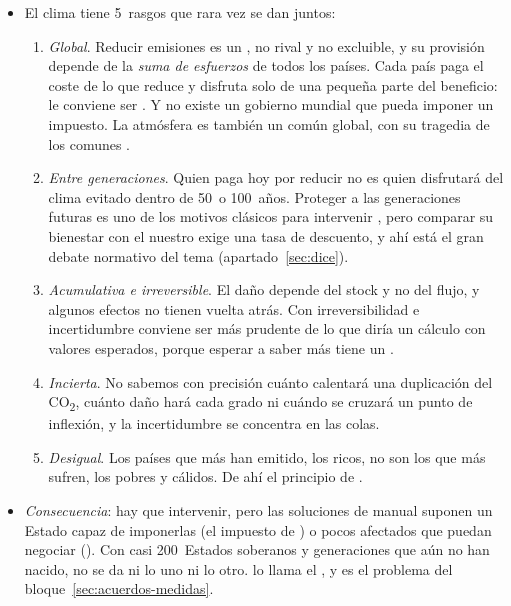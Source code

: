 \documentclass[11pt]{article}
\begin{document}
\begin{itemize}
\item El clima tiene 5~rasgos que rara vez se dan juntos:
  \begin{enumerate}
  \item \emph{Global}. Reducir emisiones es un , no rival y no excluible, y su provisión depende de la \emph{suma de esfuerzos} de todos los países\nocite{Hirshleifer1983Weakest}. Cada país paga el coste de lo que reduce y disfruta solo de una pequeña parte del beneficio: le conviene ser . Y no existe un gobierno mundial que pueda imponer un impuesto\nocite{Kindleberger1986International}. La atmósfera es también un común global, con su tragedia de los comunes .
  \item \emph{Entre generaciones}. Quien paga hoy por reducir no es quien disfrutará del clima evitado dentro de 50~o 100~años. Proteger a las generaciones futuras es uno de los motivos clásicos para intervenir , pero comparar su bienestar con el nuestro exige una tasa de descuento, y ahí está el gran debate normativo del tema (apartado~\ref{sec:dice}).
  \item \emph{Acumulativa e irreversible}. El daño depende del stock y no del flujo, y algunos efectos no tienen vuelta atrás. Con irreversibilidad e incertidumbre conviene ser más prudente de lo que diría un cálculo con valores esperados, porque esperar a saber más tiene un \nocite{ArrowFisher1974Environmental}.
  \item \emph{Incierta}. No sabemos con precisión cuánto calentará una duplicación del CO\textsubscript{2}, cuánto daño hará cada grado ni cuándo se cruzará un punto de inflexión, y la incertidumbre se concentra en las colas.
  \item \emph{Desigual}. Los países que más han emitido, los ricos, no son los que más sufren, los pobres y cálidos. De ahí el principio de \nocite{CMNUCC1992Convencion}.
  \end{enumerate}
\item \emph{Consecuencia}: hay que intervenir, pero las soluciones de manual suponen un Estado capaz de imponerlas (el impuesto de ) o pocos afectados que puedan negociar (). Con casi 200~Estados soberanos y generaciones que aún no han nacido, no se da ni lo uno ni lo otro. \textcite{Nordhaus2015Climate} lo llama el , y es el problema del bloque~\ref{sec:acuerdos-medidas}.
\end{itemize}
\end{document}
